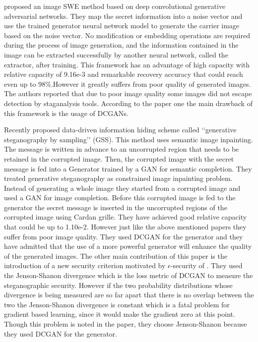 \documentclass[../main/main.tex]{subfiles}
\begin{document}
	   proposed an image \gls{SWE} method based on deep convolutional generative adversarial networks. They map the secret information into a noise vector and use the trained generator neural network model to generate the carrier image based on the noise vector. No modification or embedding operations are required during the process of image generation, and the information contained in the image can be extracted successfully by another neural network, called the extractor, after training. This framework has an advantage of high capacity with relative capacity of 9.16e-3 and remarkable recovery accuracy that could reach even up to 98\%.However it greatly suffers from poor quality of generated images. The authors reported that due to poor image quality some images did not escape detection by staganalysis tools.  According to the paper one the main drawback of this framework is the usage of \gls{DCGAN}s.
	  
	  Recently  proposed data-driven information hiding scheme called ‘‘generative steganography by sampling’’ (\gls{GSS}). This method uses semantic image inpainting. The message is written in advance to an uncorrupted region that needs to be retained in the corrupted image. Then, the corrupted image with the secret message is fed into a Generator trained by a \gls{GAN} for semantic completion. They treated generative steganography as constrained image inpainting problem. Instead of generating a whole image they started from a corrupted image and used a \gls{GAN} for image completion. Before this corrupted image is fed to the generator the secret message is inserted in the uncorrupted regions of the corrupted image using Cardan grille. They have achieved good relative capacity that could be up to 1.10e-2. However just like the above mentioned papers they suffer from poor image quality. They used \gls{DCGAN} for the generator and they have admitted that the use of a more powerful generator will enhance the quality of the generated images. The other main contribution of this paper is the introduction of a new security criterion motivated by $\epsilon$-security of . They used the Jenson-Shanon divergence which is the loss metric of \gls{DCGAN} to measure the steganographic security. However if the two probability distributions whose divergence is being measured are so far apart that there is no overlap between the two the Jenson-Shanon divergence is constant which is a fatal problem for gradient based learning, since it would make the gradient zero at this point. Though this problem is noted in the paper, they choose Jenson-Shanon because they used \gls{DCGAN} for the generator. 
	 
\end{document}
